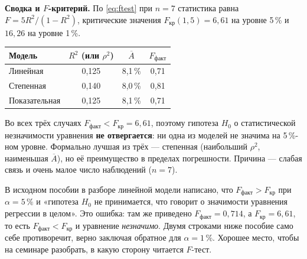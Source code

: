 \begin{solution}
\medskip
\textbf{Сводка и $F$-критерий.} По \eqref{eq:ftest} при $n = 7$ статистика
равна $F = 5R^2/(1-R^2)$, критические значения $F_{\text{кр}}(1,5) = 6{,}61$ на
уровне 5\,\% и $16{,}26$ на уровне 1\,\%.
\begin{center}
\begin{tabular}{lccc}
\toprule
Модель & $R^2$ (или $\rho^2$) & $\overline{A}$ & $F_{\text{факт}}$ \\
\midrule
Линейная       & 0,125 & 8,1\,\% & 0,71 \\
Степенная      & 0,140 & 8,0\,\% & 0,81 \\
Показательная  & 0,125 & 8,1\,\% & 0,71 \\
\bottomrule
\end{tabular}
\end{center}

\noindent Во всех трёх случаях $F_{\text{факт}} < F_{\text{кр}} = 6{,}61$, поэтому
гипотеза $H_0$ о статистической незначимости уравнения \textbf{не отвергается}:
ни одна из моделей не значима на 5\,\%-ном уровне. Формально лучшая из трёх —
степенная (наибольший $\rho^2$, наименьшая $\overline{A}$), но её преимущество
в пределах погрешности. Причина — слабая связь и очень малое число наблюдений
($n = 7$).

\begin{remark}
В исходном пособии в разборе линейной модели написано, что
$F_{\text{факт}} > F_{\text{кр}}$ при $\alpha = 5\,\%$ и «гипотеза $H_0$
не принимается, что говорит о значимости уравнения регрессии в целом».
Это ошибка: там же приведено $F_{\text{факт}} = 0{,}714$, а
$F_{\text{кр}} = 6{,}61$, то есть $F_{\text{факт}} < F_{\text{кр}}$ и уравнение
\emph{незначимо}. Двумя строками ниже пособие само себе противоречит, верно
заключая обратное для $\alpha = 1\,\%$. Хорошее место, чтобы на семинаре
разобрать, в какую сторону читается $F$-тест.
\end{remark}
\end{solution}

